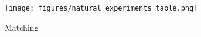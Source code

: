 \documentclass[aspectratio=169]{beamer}
\begin{document}
\begin{frame}

\begin{center}
\texttt{[image: figures/natural\_experiments\_table.png]}
\end{center}

\end{frame}
\begin{frame}

Matching

\end{frame}
\end{document}
